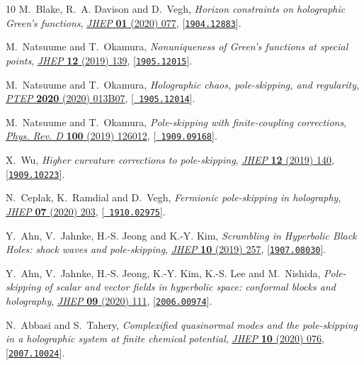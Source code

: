 \documentclass[11pt,a4paper]{article}
\begin{document}
\begin{thebibliography}{10}
M.~Blake, R.~A. Davison and D.~Vegh, \emph{{Horizon constraints on holographic
  Green\textquoteright{}s functions}},
  \href{http://dx.doi.org/10.1007/JHEP01(2020)077}{\emph{JHEP} {\bf 01} (2020)
  077}, [\href{http://arxiv.org/abs/1904.12883}{{\tt 1904.12883}}].

M.~Natsuume and T.~Okamura, \emph{{Nonuniqueness of Green\textquoteright{}s
  functions at special points}},
  \href{http://dx.doi.org/10.1007/JHEP12(2019)139}{\emph{JHEP} {\bf 12} (2019)
  139}, [\href{http://arxiv.org/abs/1905.12015}{{\tt 1905.12015}}].

M.~Natsuume and T.~Okamura, \emph{{Holographic chaos, pole-skipping, and
  regularity}}, \href{http://dx.doi.org/10.1093/ptep/ptz155}{\emph{PTEP} {\bf
  2020} (2020) 013B07}, [\href{http://arxiv.org/abs/1905.12014}{{\tt
  1905.12014}}].

M.~Natsuume and T.~Okamura, \emph{{Pole-skipping with finite-coupling
  corrections}},
  \href{http://dx.doi.org/10.1103/PhysRevD.100.126012}{\emph{Phys. Rev. D} {\bf
  100} (2019) 126012}, [\href{http://arxiv.org/abs/1909.09168}{{\tt
  1909.09168}}].

X.~Wu, \emph{{Higher curvature corrections to pole-skipping}},
  \href{http://dx.doi.org/10.1007/JHEP12(2019)140}{\emph{JHEP} {\bf 12} (2019)
  140}, [\href{http://arxiv.org/abs/1909.10223}{{\tt 1909.10223}}].

N.~Ceplak, K.~Ramdial and D.~Vegh, \emph{{Fermionic pole-skipping in
  holography}}, \href{http://dx.doi.org/10.1007/JHEP07(2020)203}{\emph{JHEP}
  {\bf 07} (2020) 203}, [\href{http://arxiv.org/abs/1910.02975}{{\tt
  1910.02975}}].

Y.~Ahn, V.~Jahnke, H.-S. Jeong and K.-Y. Kim, \emph{{Scrambling in Hyperbolic
  Black Holes: shock waves and pole-skipping}},
  \href{http://dx.doi.org/10.1007/JHEP10(2019)257}{\emph{JHEP} {\bf 10} (2019)
  257}, [\href{http://arxiv.org/abs/1907.08030}{{\tt 1907.08030}}].

Y.~Ahn, V.~Jahnke, H.-S. Jeong, K.-Y. Kim, K.-S. Lee and M.~Nishida,
  \emph{{Pole-skipping of scalar and vector fields in hyperbolic space:
  conformal blocks and holography}},
  \href{http://dx.doi.org/10.1007/JHEP09(2020)111}{\emph{JHEP} {\bf 09} (2020)
  111}, [\href{http://arxiv.org/abs/2006.00974}{{\tt 2006.00974}}].

N.~Abbasi and S.~Tahery, \emph{{Complexified quasinormal modes and the
  pole-skipping in a holographic system at finite chemical potential}},
  \href{http://dx.doi.org/10.1007/JHEP10(2020)076}{\emph{JHEP} {\bf 10} (2020)
  076}, [\href{http://arxiv.org/abs/2007.10024}{{\tt 2007.10024}}].


\end{thebibliography}
\end{document}
